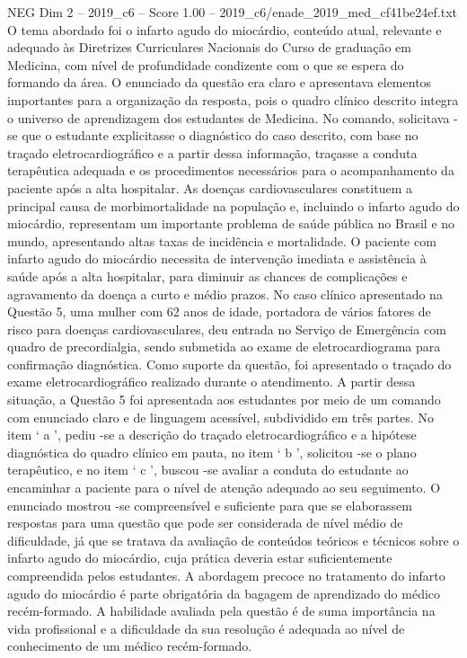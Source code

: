 \begin{textsample}{NEG Dim 2 – 2019\_c6 – Score 1.00 – 2019\_c6/enade\_2019\_med\_cf41be24ef.txt}
O tema abordado foi o infarto agudo do miocárdio, conteúdo atual, relevante e adequado às Diretrizes Curriculares Nacionais do Curso de graduação em Medicina, com nível de profundidade condizente com o que se espera do formando da área.
O enunciado da questão era claro e apresentava elementos importantes para a organização da resposta, pois o quadro clínico descrito integra o universo de aprendizagem dos estudantes de Medicina.
No comando, solicitava -se que o estudante explicitasse o diagnóstico do caso descrito, com base no traçado eletrocardiográfico e a partir dessa informação, traçasse a conduta terapêutica adequada e os procedimentos necessários para o acompanhamento da paciente após a alta hospitalar.
As doenças cardiovasculares constituem a principal causa de morbimortalidade na população e, incluindo o infarto agudo do miocárdio, representam um importante problema de saúde pública no Brasil e no mundo, apresentando altas taxas de incidência e mortalidade.
O paciente com infarto agudo do miocárdio necessita de intervenção imediata e assistência à saúde após a alta hospitalar, para diminuir as chances de complicações e agravamento da doença a curto e médio prazos.
No caso clínico apresentado na Questão 5, uma mulher com 62 anos de idade, portadora de vários fatores de risco para doenças cardiovasculares, deu entrada no Serviço de Emergência com quadro de precordialgia, sendo submetida ao exame de eletrocardiograma para confirmação diagnóstica.
Como suporte da questão, foi apresentado o traçado do exame eletrocardiográfico realizado durante o atendimento.
A partir dessa situação, a Questão 5 foi apresentada aos estudantes por meio de um comando com enunciado claro e de linguagem acessível, subdividido em três partes.
No item ‘ a ’, pediu -se a descrição do traçado eletrocardiográfico e a hipótese diagnóstica do quadro clínico em pauta, no item ‘ b ’, solicitou -se o plano terapêutico, e no item ‘ c ’, buscou -se avaliar a conduta do estudante ao encaminhar a paciente para o nível de atenção adequado ao seu seguimento.
O enunciado mostrou -se compreensível e suficiente para que se elaborassem respostas para uma questão que pode ser considerada de nível médio de dificuldade, já que se tratava da avaliação de conteúdos teóricos e técnicos sobre o infarto agudo do miocárdio, cuja prática deveria estar suficientemente compreendida pelos estudantes.
A abordagem precoce no tratamento do infarto agudo do miocárdio é parte obrigatória da bagagem de aprendizado do médico recém-formado.
A habilidade avaliada pela questão é de suma importância na vida profissional e a dificuldade da sua resolução é adequada ao nível de conhecimento de um médico recém-formado.

\end{textsample}

